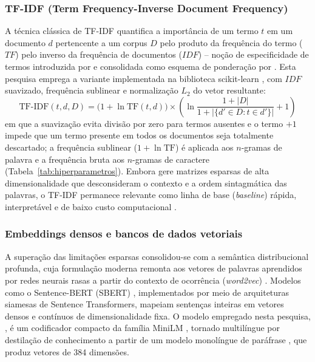 \subsubsection{TF-IDF (Term Frequency-Inverse Document Frequency)}
A técnica clássica de TF-IDF quantifica a importância de um termo $t$ em um documento $d$ pertencente a um corpus $D$ pelo produto da frequência do termo ($TF$) pelo inverso da frequência de documentos ($IDF$) -- noção de especificidade de termos introduzida por  e consolidada como esquema de ponderação por . Esta pesquisa emprega a variante implementada na biblioteca scikit-learn \cite{pedregosa2011scikit}, com $IDF$ suavizado, frequência sublinear e normalização $L_2$ do vetor resultante:
\begin{equation}
	\text{TF-IDF}(t, d, D) = \bigl(1 + \ln \text{TF}(t, d)\bigr) \times \left(\ln\frac{1 + |D|}{1 + |\{d' \in D : t \in d'\}|} + 1\right)
\end{equation}
em que a suavização evita divisão por zero para termos ausentes e o termo $+1$ impede que um termo presente em todos os documentos seja totalmente descartado; a frequência sublinear ($1 + \ln \text{TF}$) é aplicada aos $n$-gramas de palavra e a frequência bruta aos $n$-gramas de caractere (Tabela~\ref{tab:hiperparametros}). Embora gere matrizes esparsas de alta dimensionalidade que desconsideram o contexto e a ordem sintagmática das palavras, o TF-IDF permanece relevante como linha de base (\textit{baseline}) rápida, interpretável e de baixo custo computacional \cite{rajaraman2011mining}.

\subsubsection{Embeddings densos e bancos de dados vetoriais}
\label{sec:fund_embeddings_rag}
A superação das limitações esparsas consolidou-se com a semântica distribucional profunda, cuja formulação moderna remonta aos vetores de palavras aprendidos por redes neurais rasas a partir do contexto de ocorrência (\textit{word2vec}) \cite{mikolov2013efficient}. Modelos como o Sentence-BERT (SBERT) \cite{reimers2019sentence}, implementados por meio de arquiteturas siamesas de Sentence Transformers, mapeiam sentenças inteiras em vetores densos e contínuos de dimensionalidade fixa. O modelo empregado nesta pesquisa, \modelemb{}, é um codificador compacto da família MiniLM \cite{wang2020minilm}, tornado multilíngue por destilação de conhecimento a partir de um modelo monolíngue de paráfrase \cite{reimers2020multilingual}, que produz vetores de 384 dimensões.


